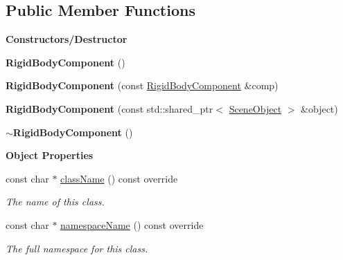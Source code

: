 \subsection*{Public Member Functions}
\begin{Indent}\textbf{ Constructors/\+Destructor}\par
\begin{DoxyCompactItemize}
\item 
\mbox{\label{classrev_1_1_rigid_body_component_a9ef2b09696fe8fe3fd5d93261d6e8392}} 
{\bfseries Rigid\+Body\+Component} ()
\item 
\mbox{\label{classrev_1_1_rigid_body_component_ae0b12f19c9168a6f5c13e46942defb33}} 
{\bfseries Rigid\+Body\+Component} (const \mbox{\hyperlink{classrev_1_1_rigid_body_component}{Rigid\+Body\+Component}} \&comp)
\item 
\mbox{\label{classrev_1_1_rigid_body_component_abff7f2813a7283b3893e4223de75a138}} 
{\bfseries Rigid\+Body\+Component} (const std\+::shared\+\_\+ptr$<$ \mbox{\hyperlink{classrev_1_1_scene_object}{Scene\+Object}} $>$ \&object)
\item 
\mbox{\label{classrev_1_1_rigid_body_component_af81b51a23ceb238d2326a67a4f2c2258}} 
{\bfseries $\sim$\+Rigid\+Body\+Component} ()
\end{DoxyCompactItemize}
\end{Indent}
\begin{Indent}\textbf{ Object Properties}\par
\begin{DoxyCompactItemize}
\item 
const char $\ast$ \mbox{\hyperlink{classrev_1_1_rigid_body_component_aac4681f78e6e53a6fceae27502b08bc5}{class\+Name}} () const override
\begin{DoxyCompactList}\small\item\em The name of this class. \end{DoxyCompactList}\item 
const char $\ast$ \mbox{\hyperlink{classrev_1_1_rigid_body_component_ae206ce233b7fffd3781cc37bbfc6e17d}{namespace\+Name}} () const override
\begin{DoxyCompactList}\small\item\em The full namespace for this class. \end{DoxyCompactList}\end{DoxyCompactItemize}
\end{Indent}
